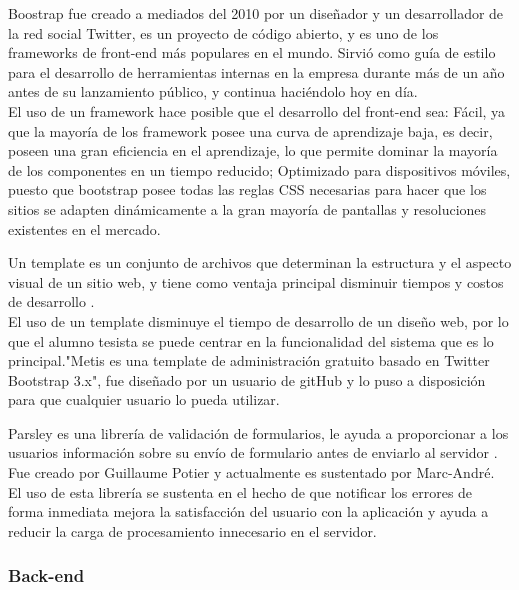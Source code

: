 
Boostrap fue creado a mediados del 2010 por un diseñador y un desarrollador de la red social Twitter, es un proyecto de código abierto, y es uno de los frameworks de front-end más populares en el mundo. Sirvió como guía de estilo para el desarrollo de herramientas internas en la empresa durante más de un año antes de su lanzamiento público, y continua haciéndolo hoy en día\cite{boo15}.
\\

El uso de un framework hace posible que el desarrollo del front-end sea: Fácil, ya que la mayoría de los framework posee una curva de aprendizaje baja, es decir, poseen una gran eficiencia en el  aprendizaje, lo que permite dominar la mayoría de los componentes en un tiempo reducido; Optimizado para dispositivos móviles, puesto que bootstrap posee todas las reglas CSS necesarias para hacer que los sitios se  adapten dinámicamente a la gran mayoría de pantallas y resoluciones existentes en el mercado.



Un template es un conjunto de archivos que determinan la estructura y el aspecto visual de un sitio web, y tiene como ventaja principal disminuir tiempos y costos de desarrollo \cite{gli15}. 
\\

El uso de un template disminuye el tiempo de desarrollo de un diseño web, por lo que el alumno tesista se puede centrar en la funcionalidad del sistema que es lo principal."Metis es una  template de administración gratuito basado en Twitter Bootstrap 3.x"\cite{git15}, fue diseñado por un usuario de gitHub y lo puso a disposición para que cualquier usuario lo pueda utilizar.


 Parsley es una librería de validación de formularios, le ayuda a proporcionar a los usuarios información sobre su envío de formulario antes de enviarlo al servidor \cite{PAR15}. Fue creado por Guillaume Potier y actualmente es sustentado por Marc-André. 
\\

El uso de esta librería se sustenta en el hecho de que notificar los errores de forma inmediata  mejora la satisfacción del usuario con la aplicación y ayuda a reducir la carga de procesamiento innecesario en el servidor.

\subsubsection{Back-end}

